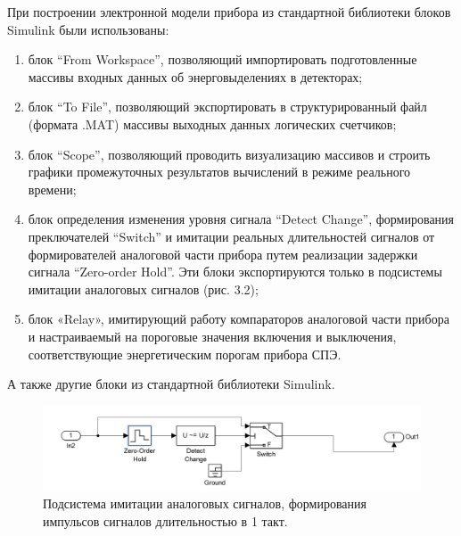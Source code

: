 При построении электронной модели прибора из стандартной библиотеки блоков Simulink были использованы:\begin{enumerate}
	\item блок “From Workspace”, позволяющий импортировать подготовленные массивы входных данных об энерговыделениях в детекторах;
	\item блок “To File”, позволяющий экспортировать в структурированный файл (формата .MAT) массивы выходных данных логических счетчиков;
	\item блок “Scope”, позволяющий проводить визуализацию массивов и строить графики промежуточных результатов вычислений в режиме реального времени;
	\item блок определения изменения уровня сигнала “Detect Change”, формирования преключателей “Switch” и имитации реальных длительностей сигналов от формирователей аналоговой части прибора путем реализации задержки сигнала “Zero-order Hold”. Эти блоки  экспортируются только в подсистемы имитации аналоговых сигналов (рис. 3.2);
	\item блок «Relay», имитирующий работу компараторов аналоговой части прибора и настраиваемый на пороговые значения включения и выключения, соответствующие энергетическим порогам прибора СПЭ.
\end{enumerate}
А также другие блоки из стандартной библиотеки Simulink.

\begin{figure}
\centering
\includegraphics[width=0.7\linewidth]{images/simulink_analog}
\caption{Подсистема имитации аналоговых сигналов, формирования импульсов сигналов длительностью в 1 такт.}
\label{fig:simulink_analog}
\end{figure}


